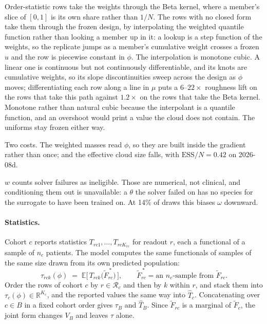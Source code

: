 \documentclass[11pt]{article}
\newcommand{\Rset}{\mathcal{R}}
\begin{document}
Order-statistic rows take the weights through the Beta kernel, where a member's
slice of $[0,1]$ is its own share rather than $1/N$. The rows with no closed form
take them through the frozen design, by interpolating the weighted quantile
function rather than looking a member up in it: a lookup is a step function of
the weights, so the replicate jumps as a member's cumulative weight crosses a
frozen $u$ and the row is piecewise constant in $\phi$. The interpolation is
monotone cubic. A linear one is continuous but not continuously differentiable,
and its knots are cumulative weights, so its slope discontinuities sweep across
the design as $\phi$ moves; differentiating each row along a line in $\mu$ puts a
$6$--$22\times$ roughness lift on the rows that take this path against
$1.2\times$ on the rows that take the Beta kernel. Monotone rather than natural
cubic because the interpolant is a quantile function, and an overshoot would
print a value the cloud does not contain. The uniforms stay frozen either way.

Two costs. The weighted masses read $\phi$, so they are built inside the gradient
rather than once; and the effective cloud size falls, with $\mathrm{ESS}/N = 0.42$
on 2026-08d.

$w$ counts solver failures as ineligible. Those are numerical, not clinical, and
conditioning them out is unavailable: a $\theta$ the solver failed on has no
species for the surrogate to have been trained on. At 14\% of draws this biases
$\omega$ downward.

\paragraph{Statistics.} Cohort $c$ reports statistics $T_{rc1},\dots,T_{rcK_{rc}}$
for readout $r$, each a functional of a sample of $n_c$ patients. The model
computes the same functionals of samples of the same size drawn from its own
predicted population:
\begin{equation}
\tau_{rck}(\phi) \;=\;
\mathbb{E}\Big[\,T_{rck}\big(\tilde F^{\,\ast}_{rc}\big)\,\Big],
\qquad
\tilde F^{\,\ast}_{rc} = \text{an } n_c\text{-sample from } \tilde F_{rc}.
\label{eq:stat}
\end{equation}
Order the rows of cohort $c$ by $r\in\Rset_c$ and then by $k$ within $r$, and
stack them into $\tau_c(\phi)\in\mathbb{R}^{K_c}$, and the reported values the
same way into $\widehat T_c$. Concatenating over $c\in B$ in a fixed cohort order
gives $\tau_B$ and $\widehat T_B$. Since $\tilde F_{rc}$ is a marginal of $\tilde
F_c$, the joint form changes $V_B$ and leaves $\tau$ alone.
\end{document}
